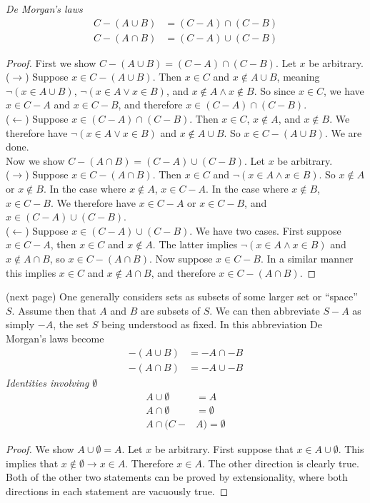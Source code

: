 \documentclass{report}
\begin{document}
\noindent\textit{De Morgan's laws}
\begin{align*}
C-(A\cup B)&=(C-A)\cap(C-B)\\
C-(A\cap B)&=(C-A)\cup(C-B)
\end{align*}
\begin{proof}
First we show $C-(A\cup B)=(C-A)\cap(C-B)$. Let $x$ be arbitrary.\\
\indent($\rightarrow$) Suppose $x\in C-(A\cup B)$. Then $x\in C$ and $x\notin A\cup B$, meaning $\neg(x\in A\cup B)$, $\neg(x\in A\lor x\in B)$, and $x\notin A\land x\notin B$. 
So since $x\in C$, we have $x\in C-A$ and $x\in C-B$, and therefore $x\in(C-A)\cap(C-B)$.\\
\indent($\leftarrow$) Suppose $x\in(C-A)\cap(C-B)$. Then $x\in C$, $x\notin A$, and $x\notin B$.
We therefore have $\neg(x\in A\lor x\in B)$ and $x\notin A\cup B$. So $x\in C-(A\cup B)$. We are done.\\
\indent Now we show $C-(A\cap B)=(C-A)\cup(C-B)$. Let $x$ be arbitrary.\\
\indent ($\rightarrow$) Suppose $x\in C-(A\cap B)$. Then $x\in C$ and $\neg(x\in A\land x\in B)$. So $x\notin A$ or $x\notin B$. In the case where $x\notin A$, $x\in C-A$.
In the case where $x\notin B$, $x\in C-B$. We therefore have $x\in C-A$ or $x\in C-B$, and $x\in(C-A)\cup(C-B)$.\\
\indent ($\leftarrow$) Suppose $x\in(C-A)\cup(C-B)$. We have two cases. First suppose $x\in C-A$, then $x\in C$ and $x\notin A$. The latter implies $\neg(x\in A\land x\in B)$ and $x\notin A\cap B$,
so $x\in C-(A\cap B)$. Now suppose $x\in C-B$. In a similar manner this implies $x\in C$ and $x\notin A\cap B$, and therefore $x\in C-(A\cap B)$.
\end{proof}
\noindent(next page)\newpage
\noindent One generally considers sets as subsets of some larger set or ``space'' $S$. Assume then that $A$ and $B$ are subsets of $S$. We can then abbreviate $S-A$ as simply $-A$, the set $S$
being understood as fixed. In this abbreviation De Morgan's laws become
\begin{align*}
-(A\cup B)&=-A\cap-B\\
-(A\cap B)&=-A\cup-B
\end{align*}
\noindent\textit{Identities involving $\emptyset$}
\begin{align*}
A\cup\emptyset&=A\\
A\cap\emptyset&=\emptyset\\
A\cap(C-&A)=\emptyset
\end{align*}
\begin{proof}
We show $A\cup\emptyset=A$. Let $x$ be arbitrary. First suppose that $x\in A\cup\emptyset$. This implies that $x\notin\emptyset\to x\in A$. Therefore $x\in A$. The other direction is clearly true.\\
\indent Both of the other two statements can be proved by extensionality, where both directions in each statement are vacuously true.
\end{proof}
\end{document}
